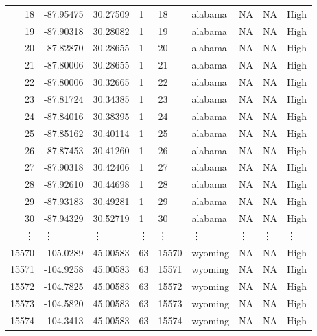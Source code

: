 \documentclass[11pt]{article}
\begin{document}
\begin{tabular}{r|llllllll}
	18 & -87.95475 & 30.27509  & 1         & 18        & alabama   & NA        & NA        & High     \\
	19 & -87.90318 & 30.28082  & 1         & 19        & alabama   & NA        & NA        & High     \\
	20 & -87.82870 & 30.28655  & 1         & 20        & alabama   & NA        & NA        & High     \\
	21 & -87.80006 & 30.28655  & 1         & 21        & alabama   & NA        & NA        & High     \\
	22 & -87.80006 & 30.32665  & 1         & 22        & alabama   & NA        & NA        & High     \\
	23 & -87.81724 & 30.34385  & 1         & 23        & alabama   & NA        & NA        & High     \\
	24 & -87.84016 & 30.38395  & 1         & 24        & alabama   & NA        & NA        & High     \\
	25 & -87.85162 & 30.40114  & 1         & 25        & alabama   & NA        & NA        & High     \\
	26 & -87.87453 & 30.41260  & 1         & 26        & alabama   & NA        & NA        & High     \\
	27 & -87.90318 & 30.42406  & 1         & 27        & alabama   & NA        & NA        & High     \\
	28 & -87.92610 & 30.44698  & 1         & 28        & alabama   & NA        & NA        & High     \\
	29 & -87.93183 & 30.49281  & 1         & 29        & alabama   & NA        & NA        & High     \\
	30 & -87.94329 & 30.52719  & 1         & 30        & alabama   & NA        & NA        & High     \\
	⋮ & ⋮ & ⋮ & ⋮ & ⋮ & ⋮ & ⋮ & ⋮ & ⋮\\
	15570 & -105.0289 & 45.00583  & 63        & 15570     & wyoming   & NA        & NA        & High     \\
	15571 & -104.9258 & 45.00583  & 63        & 15571     & wyoming   & NA        & NA        & High     \\
	15572 & -104.7825 & 45.00583  & 63        & 15572     & wyoming   & NA        & NA        & High     \\
	15573 & -104.5820 & 45.00583  & 63        & 15573     & wyoming   & NA        & NA        & High     \\
	15574 & -104.3413 & 45.00583  & 63        & 15574     & wyoming   & NA        & NA        & High     \\

\end{tabular}
\end{document}
